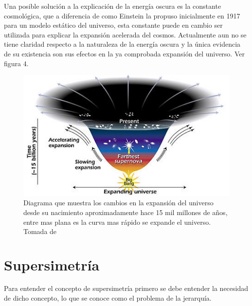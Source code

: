 \documentclass[journal]{IEEEtran}
\begin{document}
Una posible solución  a la explicación de la energía oscura es la constante cosmológica, que a diferencia de como Einstein la propuso inicialmente en 1917 para un modelo estático del universo, esta constante puede en cambio ser utilizada para explicar la expansión acelerada del cosmos. Actualmente aun no se tiene claridad respecto a la naturaleza de la energía oscura y la única evidencia de su existencia son sus efectos en la ya comprobada expansión del universo. Ver figura 4.

\begin{figure}[!htb]
\centering
\includegraphics[width=.9\linewidth,height=6 cm]{DarkEnergy.jpg}
\caption{Diagrama que  muestra los cambios en la expansión del universo desde su nacimiento aproximadamente hace 15 mil millones de años, entre mas plana es la curva mas rápido se expande el universo. Tomada de \hspace{.2cm}\cite{Nasa}}
\label{Dark Energy}
\end{figure}

\section{Supersimetría}

Para entender el concepto de supersimetría primero se debe entender la necesidad de dicho concepto, lo que se conoce como el problema de la jerarquía.
\end{document}
